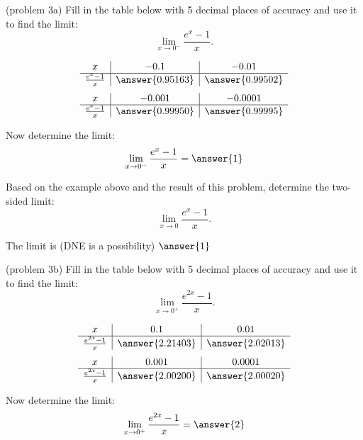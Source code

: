 \documentclass[handout]{ximera}
\begin{document}
\begin{problem}(problem 3a)
Fill in the table below with 5 decimal places of accuracy and use it to find the limit:
\[\lim_{x \to 0^-} \frac{e^x - 1}{x}.\]

\begin{prompt}
\begin{center}
\[
\begin{array}{ c | c | c }
  x & -0.1 & -0.01   \\ 
	\hline 
	 \frac{e^x - 1}{x} & \answer{0.95163} & \answer{0.99502} 
\end{array}
\]
\[
\begin{array}{ c | c | c  }
  x  & -0.001 & -0.0001 \\ 
	\hline 
	 \frac{e^x - 1}{x}  & \answer{0.99950} & \answer{0.99995}
\end{array}
\]
\end{center}
Now determine the limit:
\[
\lim_{x \to 0^-} \frac{e^x - 1}{x} = \answer{1}
\]
\end{prompt}

Based on the example above and the result of this problem, determine the two-sided limit:
\[
\lim_{x \to 0} \frac{e^x - 1}{x}.
\]

The limit is (DNE is a possibility) $\answer{1}$

\end{problem}


\begin{problem}(problem 3b)
Fill in the table below with 5 decimal places of accuracy and use it to find the limit:
\[\lim_{x \to 0^+} \frac{e^{2x} - 1}{x}.\]

\begin{prompt}
\begin{center}
\[
\begin{array}{ c | c | c }
  x & 0.1 & 0.01   \\ 
	\hline 
	 \frac{e^{2x} - 1}{x} & \answer{2.21403} & \answer{2.02013} 
\end{array}
\]
\[
\begin{array}{ c | c | c  }
  x  & 0.001 & 0.0001 \\ 
	\hline 
	 \frac{e^{2x} - 1}{x}  & \answer{2.00200} & \answer{2.00020}
\end{array}
\]
\end{center}
Now determine the limit:
\[
\lim_{x \to 0^+} \frac{e^{2x} - 1}{x} = \answer{2}
\]
\end{prompt}
\end{problem}
\end{document}
